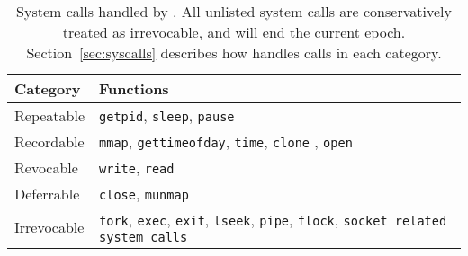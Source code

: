 \begin{table}[t]
	\centering
	\small
	\renewcommand{\arraystretch}{1.5}
	\begin{tabular}{l|p{6cm}}
		\textbf{Category} & \textbf{Functions} \\
		\hline
		
		Repeatable		& \texttt{getpid}, \texttt{sleep}, \texttt{pause}\\
		
		Recordable		& \texttt{mmap}, \texttt{gettimeofday}, \texttt{time}, 
						  \texttt{clone} , \texttt{open}\\
		
		Revocable		& \texttt{write}, \texttt{read} \\
		
		Deferrable		& \texttt{close}, \texttt{munmap} \\
		
		Irrevocable		& \texttt{fork}, \texttt{exec}, \texttt{exit}, \texttt{lseek}, \texttt{pipe}, \texttt{flock}, \texttt{socket related system calls}\\
	\end{tabular}
	\caption{System calls handled by \doubletake{}. All unlisted system calls are conservatively treated as irrevocable, and will end the current epoch. Section~\ref{sec:syscalls} describes how \doubletake{} handles calls in each category.\label{table:syscalls}}
\end{table}